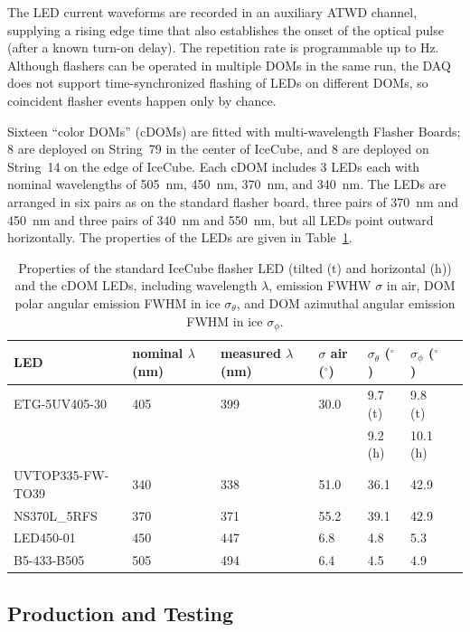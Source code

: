 The LED current waveforms are recorded in an auxiliary ATWD channel, supplying
a rising edge time that also establishes the onset of the optical pulse (after a known
turn-on delay).
The repetition rate is programmable up to \unit[610]{Hz}.
Although flashers can be
operated in multiple DOMs in the same run, the DAQ does not support
time-synchronized flashing of LEDs on different DOMs, so coincident flasher
events happen only by chance. 

Sixteen ``color DOMs'' (cDOMs) are fitted with multi-wavelength
Flasher Boards; 8 are deployed on String~79 in the center of IceCube, and 8
are deployed on String~14 on the edge of IceCube.  Each cDOM includes
3 LEDs each with nominal
wavelengths of 505~nm, 450~nm, 370~nm, and 340~nm. The LEDs are
arranged in six pairs as on the
standard flasher board, three pairs of 370~nm and 450~nm and three
pairs of 340~nm and 550~nm, but all LEDs point outward horizontally. 
The properties of the LEDs are given in
Table~\ref{table:cdom_properties}.

\begin{table}
\caption{Properties of the standard IceCube flasher LED (tilted (t)
  and horizontal (h)) and the cDOM LEDs, including wavelength $\lambda$,
  emission FWHW $\sigma$ in air, DOM polar
  angular emission FWHM in ice $\sigma_{\theta}$, and DOM azimuthal angular emission
  FWHM in ice $\sigma_{\phi}$.}
\begin{tabularx}{\linewidth}{lXXXXXX}
\toprule
 LED& nominal $\lambda$ (nm) & measured $\lambda$ (nm) & $\sigma$ air ($^{\circ}$) &
 $\sigma_{\theta}$ ($^{\circ}$) & $\sigma_{\phi}$ ($^{\circ}$)\\
\midrule
ETG-5UV405-30 & 405 & 399 & 30.0 & 9.7 (t)& 9.8 (t) \\
 &  &  &  & 9.2 (h)& 10.1 (h)\\
UVTOP335-FW-TO39 & 340 & 338 & 51.0 & 36.1 & 42.9 \\
NS370L\_5RFS & 370 & 371 & 55.2 & 39.1 & 42.9 \\
LED450-01 & 450 & 447 &	6.8 & 4.8 &	5.3 \\
B5-433-B505 & 505 & 494 & 6.4 &	4.5 & 4.9 \\
\bottomrule
\end{tabularx}
\label{table:cdom_properties}
\end{table}

\subsection{\label{sec:dom_prodtest}Production and Testing}

